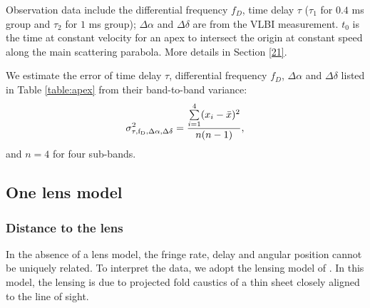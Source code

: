 \documentclass[useAMS,usenatbib]{mn2e}
\begin{document}
\begin{table}
{Observation data include the differential frequency $f_D$, time delay
$\tau$ ($\tau_1$ for $0.4$ ms group and $\tau_2$ for $1$ ms group);
$\Delta\alpha$ and $\Delta\delta$ are from the VLBI measurement. 
$t_0$ is the time at constant velocity for an apex to intersect the
origin at constant speed along the main scattering parabola.  More
details in Section \ref{21}.
}
\label{table:apex}
\end{table}



We estimate the error of time delay $\tau$, differential frequency
$f_D$, $\Delta\alpha$ and $\Delta\delta$  listed in Table
\ref{table:apex} from their band-to-band variance:
\begin{equation}
\begin{aligned}
\sigma^2_{\rm \tau, f_D,\Delta\alpha, \Delta\delta} = \frac{\sum\limits^{4}_{i=1}(x_i-\bar{x})^2}{n(n-1)},
\end{aligned}
\end{equation}
and $n=4$ for four sub-bands.


\subsection{One lens model}
\subsubsection{Distance to the lens}
In the absence of a lens model, the
fringe rate, delay and angular position cannot be uniquely related. To interpret the data, we adopt the lensing model of
\citep{2014MNRAS.442.3338P}.  In this model, the lensing is due to projected fold caustics of a thin sheet closely aligned to the line of sight. 
\end{document}
